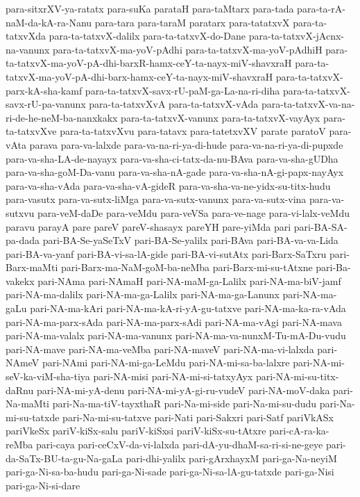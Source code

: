 {para-sitxrXV-ya-ratatx
para-suKa
parataH
para-taMtarx
para-tada
para-ta-rA-naM-da-kA-ra-Nanu
para-tara
para-taraM
paratarx
para-tatatxvX
para-ta-tatxvXda
para-ta-tatxvX-dalilx
para-ta-tatxvX-do-Dane
para-ta-tatxvX-jAcnx-na-vanunx
para-ta-tatxvX-ma-yoV-pAdhi
para-ta-tatxvX-ma-yoV-pAdhiH
para-ta-tatxvX-ma-yoV-pA-dhi-barxR-hamx-ceY-ta-nayx-miV-shavxraH
para-ta-tatxvX-ma-yoV-pA-dhi-barx-hamx-ceY-ta-nayx-miV-shavxraH
para-ta-tatxvX-parx-kA-sha-kamf
para-ta-tatxvX-savx-rU-paM-ga-La-na-ri-diha
para-ta-tatxvX-savx-rU-pa-vanunx
para-ta-tatxvXvA
para-ta-tatxvX-vAda
para-ta-tatxvX-va-na-ri-de-he-neM-ba-nanxkakx
para-ta-tatxvX-vanunx
para-ta-tatxvX-vayAyx
para-ta-tatxvXve
para-ta-tatxvXvu
para-tatavx
para-tatetxvXV
parate
paratoV
para-vAta
parava
para-va-lalxde
para-va-na-ri-ya-di-hude
para-va-na-ri-ya-di-pupxde
para-va-sha-LA-de-nayayx
para-va-sha-ci-tatx-da-nu-BAva
para-va-sha-gUDha
para-va-sha-goM-Da-vanu
para-va-sha-nA-gade
para-va-sha-nA-gi-papx-nayAyx
para-va-sha-vAda
para-va-sha-vA-gideR
para-va-sha-va-ne-yidx-su-titx-hudu
para-vasutx
para-va-sutx-liMga
para-va-sutx-vanunx
para-va-sutx-vina
para-va-sutxvu
para-veM-daDe
para-veMdu
para-veVSa
para-ve-nage
para-vi-lalx-veMdu
paravu
parayA
pare
pareV
pareV-shasayx
pareYH
pare-yiMda
pari
pari-BA-SA-pa-dada
pari-BA-Se-yaSeTxV
pari-BA-Se-yalilx
pari-BAva
pari-BA-va-va-Lida
pari-BA-va-yanf
pari-BA-vi-sa-lA-gide
pari-BA-vi-sutAtx
pari-Barx-SaTxru
pari-Barx-maMti
pari-Barx-ma-NaM-goM-ba-neMba
pari-Barx-mi-su-tAtxne
pari-Ba-vakekx
pari-NAma
pari-NAmaH
pari-NA-maM-ga-Lalilx
pari-NA-ma-biV-jamf
pari-NA-ma-dalilx
pari-NA-ma-ga-Lalilx
pari-NA-ma-ga-Lanunx
pari-NA-ma-gaLu
pari-NA-ma-kAri
pari-NA-ma-kA-ri-yA-gu-tatxve
pari-NA-ma-ka-ra-vAda
pari-NA-ma-parx-sAda
pari-NA-ma-parx-sAdi
pari-NA-ma-vAgi
pari-NA-mava
pari-NA-ma-valalx
pari-NA-ma-vanunx
pari-NA-ma-va-nunxM-Tu-mA-Du-vudu
pari-NA-mave
pari-NA-ma-veMba
pari-NA-maveV
pari-NA-ma-vi-lalxda
pari-NAmeV
pari-NAmi
pari-NA-mi-ga-LeMdu
pari-NA-mi-sa-ba-lalxre
pari-NA-mi-seV-ka-viM-sha-tiya
pari-NA-misi
pari-NA-mi-si-tatxyAyx
pari-NA-mi-su-titx-daRnu
pari-NA-mi-yA-denu
pari-NA-mi-yA-gi-ru-vudeV
pari-NA-moV-daka
pari-Na-maMti
pari-Na-ma-tiV-tayxthaR
pari-Na-mi-side
pari-Na-mi-su-dudu
pari-Na-mi-su-tatxde
pari-Na-mi-su-tatxve
pari-Nati
pari-Sakxri
pari-Satf
pariVkASx
pariVkeSx
pariV-kiSx-salu
pariV-kiSxsi
pariV-kiSx-su-tAtxre
pari-cA-ra-ka-reMba
pari-caya
pari-ceCxV-da-vi-lalxda
pari-dA-yu-dhaM-sa-ri-si-ne-geye
pari-da-SaTx-BU-ta-gu-Na-gaLa
pari-dhi-yalilx
pari-gArxhayxM
pari-ga-Na-neyiM
pari-ga-Ni-sa-ba-hudu
pari-ga-Ni-sade
pari-ga-Ni-sa-lA-gu-tatxde
pari-ga-Nisi
pari-ga-Ni-si-dare
}
